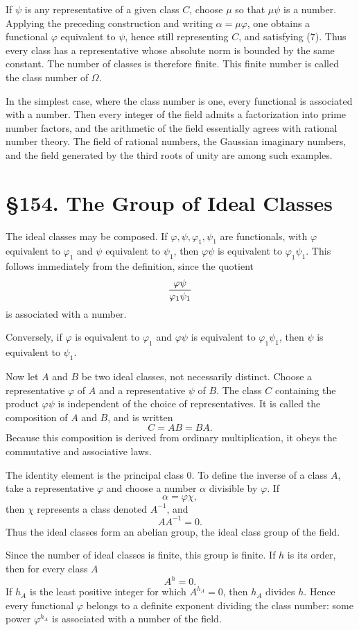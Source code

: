 \documentclass[12pt,a4paper]{article}
\newcommand{\webersection}[2]{\clearpage\section*{\S #1. #2}}
\begin{document}
If \(\psi\) is any representative of a given class \(C\), choose \(\mu\) so that \(\mu\psi\) is a number.  Applying the preceding construction and writing \(\alpha=\mu\varphi\), one obtains a functional \(\varphi\) equivalent to \(\psi\), hence still representing \(C\), and satisfying (7).  Thus every class has a representative whose absolute norm is bounded by the same constant.  The number of classes is therefore finite.  This finite number is called the class number of \(\Omega\).

In the simplest case, where the class number is one, every functional is associated with a number.  Then every integer of the field admits a factorization into prime number factors, and the arithmetic of the field essentially agrees with rational number theory.  The field of rational numbers, the Gaussian imaginary numbers, and the field generated by the third roots of unity are among such examples.

\webersection{154}{The Group of Ideal Classes}

The ideal classes may be composed.  If \(\varphi,\psi,\varphi_1,\psi_1\) are functionals, with \(\varphi\) equivalent to \(\varphi_1\) and \(\psi\) equivalent to \(\psi_1\), then \(\varphi\psi\) is equivalent to \(\varphi_1\psi_1\).  This follows immediately from the definition, since the quotient
\[
 {\varphi\psi\over \varphi_1\psi_1}
\]
is associated with a number.

Conversely, if \(\varphi\) is equivalent to \(\varphi_1\) and \(\varphi\psi\) is equivalent to \(\varphi_1\psi_1\), then \(\psi\) is equivalent to \(\psi_1\).

Now let \(A\) and \(B\) be two ideal classes, not necessarily distinct.  Choose a representative \(\varphi\) of \(A\) and a representative \(\psi\) of \(B\).  The class \(C\) containing the product \(\varphi\psi\) is independent of the choice of representatives.  It is called the composition of \(A\) and \(B\), and is written
\begin{equation}
 C=AB=BA. \tag{1}
\end{equation}
Because this composition is derived from ordinary multiplication, it obeys the commutative and associative laws.

The identity element is the principal class \(0\).  To define the inverse of a class \(A\), take a representative \(\varphi\) and choose a number \(\alpha\) divisible by \(\varphi\).  If
\[
 \alpha=\varphi\chi,
\]
then \(\chi\) represents a class denoted \(A^{-1}\), and
\begin{equation}
 AA^{-1}=0. \tag{2}
\end{equation}
Thus the ideal classes form an abelian group, the ideal class group of the field.

Since the number of ideal classes is finite, this group is finite.  If \(h\) is its order, then for every class \(A\)
\begin{equation}
 A^h=0. \tag{3}
\end{equation}
If \(h_A\) is the least positive integer for which \(A^{h_A}=0\), then \(h_A\) divides \(h\).  Hence every functional \(\varphi\) belongs to a definite exponent dividing the class number: some power \(\varphi^{h_A}\) is associated with a number of the field.
\end{document}
